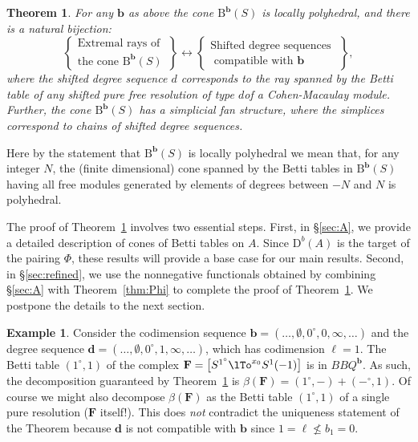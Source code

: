 \documentclass[12pt]{amsart}
\newtheorem{thm}[lemma]{Theorem}
\theoremstyle{definition}
\newtheorem{example}[lemma]{Example}
\theoremstyle{remark}
\newcommand{\bb}{\mathbf{b}}
\newcommand{\dd}{\mathbf{d}}
\newcommand{\FF}{\mathbf{F}}
\newcommand{\defi}[1]{\textsf{#1}} %
\newcommand{\DD}{\mathrm{D}}
\newcommand{\BBQ}{\mathrm{B}}
\begin{document}
\begin{thm}\label{thm:extremal rays refined}
For any $\bb$ as above the cone $\BBQ^{\bb}(S)$ is locally polyhedral, and there is a natural bijection:
\[
\left\{
\begin{matrix}
\text{Extremal rays of }\\
\text{the cone } \BBQ^{\bb}(S)
\end{matrix}
\right\}
\longleftrightarrow
\left\{
\begin{matrix}
\text{Shifted degree sequences }\\
\text{ compatible with $\bb$}
\end{matrix}
\right\},
\]
where the shifted degree sequence $d$ corresponds to the ray spanned by 
the Betti table of any shifted pure free resolution of type $d$of a Cohen-Macaulay module. Further, the cone $\BBQ^{\bb}(S)$ has a simplicial fan structure, where the simplices correspond to chains of shifted degree sequences.
\end{thm}

Here by the statement that $\BBQ^{\bb}(S)$ is \defi{locally polyhedral} we mean that,
for any integer $N$,
the (finite dimensional) cone spanned by the Betti tables in $\BBQ^{\bb}(S)$ having
all free modules generated by elements of degrees between $-N$ and $N$ is polyhedral.

The proof of Theorem~\ref{thm:extremal rays refined} involves two essential steps.  First, in \S\ref{sec:A}, we provide a detailed description of cones of Betti tables on $A$.  Since $\DD^b(A)$ is the target of the pairing $\Phi$, these results will provide a base case for our main results.  Second, in \S\ref{sec:refined}, 
we use the nonnegative functionals obtained by combining  \S\ref{sec:A} with Theorem~\ref{thm:Phi} to complete the proof of Theorem~\ref{thm:extremal rays refined}. We postpone the details to the next section.

\begin{example}  

 Consider the codimension sequence $\bb=(\dots, \emptyset,0^\circ,0,\infty,\dots)$ and the degree sequence $\dd=(\dots, \emptyset,0^\circ ,1,\infty,\dots)$, which has codimension $\ell = 1$.  The Betti table 
 $(1^\circ, 1)$ of the complex $\FF=\left[ S^{1^\circ}\lTo^{x_{0}} S^1(-1)\right]$ is in $BBQ^{\bb}$.
 As such, the decomposition guaranteed by Theorem~\ref{thm:extremal rays refined} is
 $\beta(\FF) = (1^{\circ}, -) + (-^{\circ}, 1)$. Of course we might also decompose $\beta(\FF)$
 as the Betti table $(1^{\circ}, 1)$ of a single pure resolution ($\FF$ itself!). This does \emph{not} contradict the uniqueness statement of the Theorem because $\dd$ is not compatible with $\bb$
 since $1= \ell \not\leq b_{1}= 0$.
\end{example}
\end{document}
